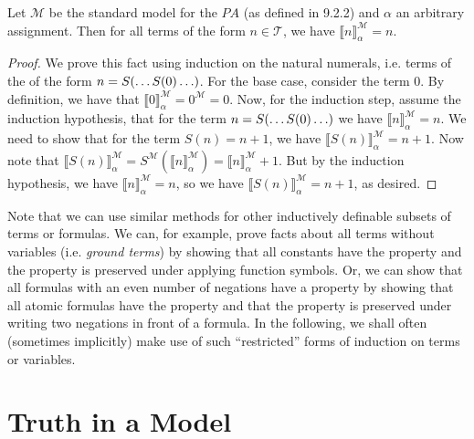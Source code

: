 \begin{enumerate}[\thesection.1]
	\begin{lemma}[9.7.2.i]
          Let $\mathcal{M}$ be the standard model for the $PA$ (as defined in 9.2.2) and $\alpha$ an arbitrary assignment. Then for all terms of the form $n\in\mathcal{T}$, we have $\llbracket n\rrbracket^\mathcal{M}_\alpha=n$. 
	\end{lemma}
        \begin{proof}
          We prove this fact using induction on the natural numerals, i.e. terms of the of the form $n=S(\mathellipsis S(0)\mathellipsis)$. For the base case, consider the term $0$. By definition, we have that $\llbracket 0\rrbracket^\mathcal{M}_\alpha=0^\mathcal{M}=0$. Now, for the induction step, assume the induction hypothesis, that for the term $n=S(\mathellipsis S(0)\mathellipsis)$ we have  $\llbracket n\rrbracket^\mathcal{M}_\alpha=n$. We need to show that for the term $S(n)=n+1$, we have  $\llbracket S(n)\rrbracket^\mathcal{M}_\alpha=n+1$. Now note that $\llbracket S(n)\rrbracket^\mathcal{M}_\alpha=S^\mathcal{M}(\llbracket n\rrbracket^\mathcal{M}_\alpha)=\llbracket n\rrbracket^\mathcal{M}_\alpha+1$. But by the induction hypothesis, we have $\llbracket n\rrbracket^\mathcal{M}_\alpha=n$, so we have  $\llbracket S(n)\rrbracket^\mathcal{M}_\alpha=n+1$, as desired.
        \end{proof}

        Note that we can use similar methods for other inductively definable subsets of terms or formulas. We can, for example, prove facts about all terms without variables (i.e. \emph{ground terms}) by showing that all constants have the property and the property is preserved under applying function symbols. Or, we can show that all formulas with an even number of negations have a property by showing that all atomic formulas have the property and that the property is preserved under writing two negations in front of a formula. In the following, we shall often (sometimes implicitly) make use of such ``restricted'' forms of induction on terms or variables.
	
	\end{enumerate}


\section{Truth in a Model}


